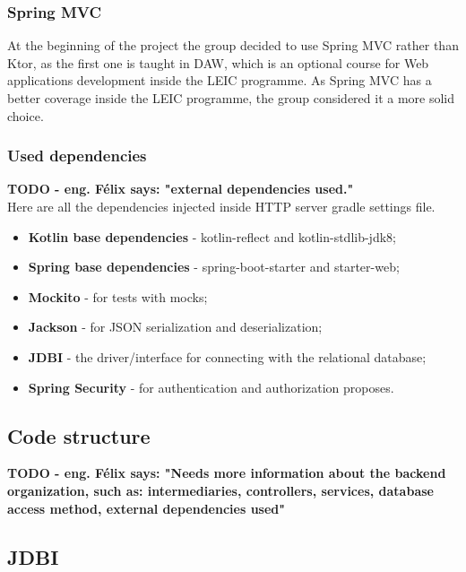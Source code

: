 \subsubsection{Spring MVC}

At the beginning of the project the group decided to use Spring MVC rather than Ktor, as the first one is taught in DAW, which is an optional course
for Web applications development inside the LEIC programme. As Spring MVC has a better coverage inside the LEIC programme, the group considered 
it a more solid choice.\\

\subsubsection{Used dependencies}

\textbf{TODO - eng. Félix says: "external dependencies used."}\\

Here are all the dependencies injected inside HTTP server gradle settings file.\\

\begin{itemize}
    \item \textbf{Kotlin base dependencies} - kotlin-reflect and kotlin-stdlib-jdk8;
    \item \textbf{Spring base dependencies} - spring-boot-starter and starter-web;
    \item \textbf{Mockito} - for tests with mocks;
    \item \textbf{Jackson} - for JSON serialization and deserialization;
    \item \textbf{JDBI} - the driver/interface for connecting with the relational database;
    \item \textbf{Spring Security} - for authentication and authorization proposes.
\end{itemize}

\subsection{Code structure}

\textbf{TODO - eng. Félix says: "Needs more information about the backend organization, such as: intermediaries, controllers, services, database access method, external dependencies used"}

\subsection{JDBI}

